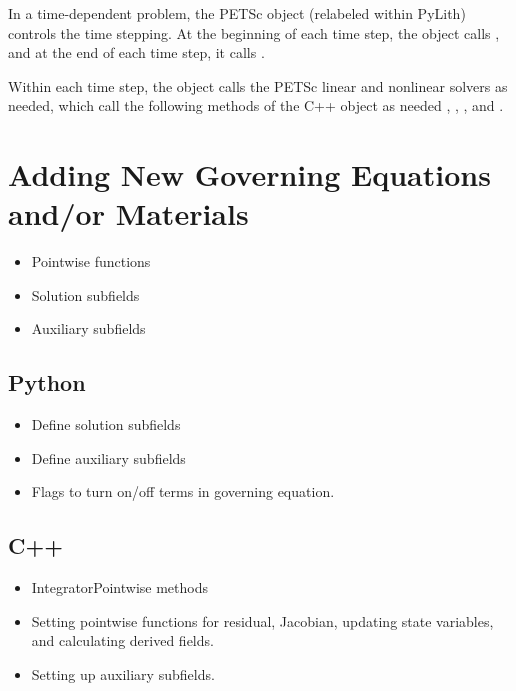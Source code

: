 In a time-dependent problem, the PETSc  object (relabeled
 within PyLith) controls the time stepping. At the
beginning of each time step, the  object calls
, and at the end of each
time step, it calls .

Within each time step, the  object calls the PETSc
linear and nonlinear solvers as needed, which call the following
methods of the C++  object as
needed
,
,
, and
.

\section{Adding New Governing Equations and/or Materials}


\begin{itemize}
\item Pointwise functions
\item Solution subfields
\item Auxiliary subfields
\end{itemize}

\subsection{Python}

\begin{itemize}
\item Define solution subfields
\item Define auxiliary subfields
\item Flags to turn on/off terms in governing equation.
\end{itemize}

\subsection{C++}

\begin{itemize}
\item IntegratorPointwise methods
\item Setting pointwise functions for residual, Jacobian, updating
  state variables, and calculating derived fields.
\item Setting up auxiliary subfields.
\end{itemize}
  
